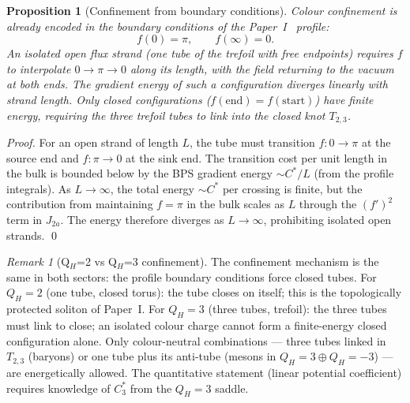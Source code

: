 \documentclass[11pt,a4paper]{article}
\newtheorem{proposition}[theorem]{Proposition}
\theoremstyle{definition}\newtheorem{definition}[theorem]{Definition}
\theoremstyle{remark}
\newtheorem{remark}[theorem]{Remark}
\newcommand{\QH}{Q_H}
\begin{document}
\begin{proposition}[Confinement from boundary conditions]
\label{P15:prop:confinement}
Colour confinement is already encoded in the boundary conditions
of the Paper~I~\cite{Paper1} profile:
\begin{equation}
  f(0) = \pi,\qquad f(\infty) = 0.
  \label{P15:eq:BC}
\end{equation}
An isolated open flux strand (one tube of the trefoil with free
endpoints) requires $f$ to interpolate $0\to\pi\to 0$ along its
length, with the field returning to the vacuum at both ends.
The gradient energy of such a configuration diverges linearly
with strand length.
Only closed configurations ($f(\text{end})=f(\text{start})$)
have finite energy, requiring the three trefoil tubes to link
into the closed knot $T_{2,3}$.
\end{proposition}

\begin{proof}
For an open strand of length $L$, the tube must transition
$f:0\to\pi$ at the source end and $f:\pi\to 0$ at the sink end.
The transition cost per unit length in the bulk is bounded below
by the BPS gradient energy $\sim C^*/L$ (from the profile integrals).
As $L\to\infty$, the total energy $\sim C^*$ per crossing is finite,
but the contribution from maintaining $f=\pi$ in the bulk
scales as $L$ through the $(f')^2$ term in $J_{2a}$.
The energy therefore diverges as $L\to\infty$, prohibiting
isolated open strands.
\qed
\end{proof}

\begin{remark}[Q$_H$=2 vs Q$_H$=3 confinement]
\label{P15:rem:qh2_vs_qh3_confinement}
The confinement mechanism is the same in both sectors:
the profile boundary conditions force closed tubes.
For $\QH=2$ (one tube, closed torus): the tube closes on itself;
this is the topologically protected soliton of Paper~I.
For $\QH=3$ (three tubes, trefoil): the three tubes must link to
close; an isolated colour charge cannot form a finite-energy
closed configuration alone.
Only colour-neutral combinations --- three tubes linked in
$T_{2,3}$ (baryons) or one tube plus its anti-tube (mesons in
$\QH=3\oplus\QH=-3$) --- are energetically allowed.
The quantitative statement (linear potential coefficient) requires
knowledge of $C^*_3$ from the $\QH=3$ saddle.
\end{remark}
\end{document}
